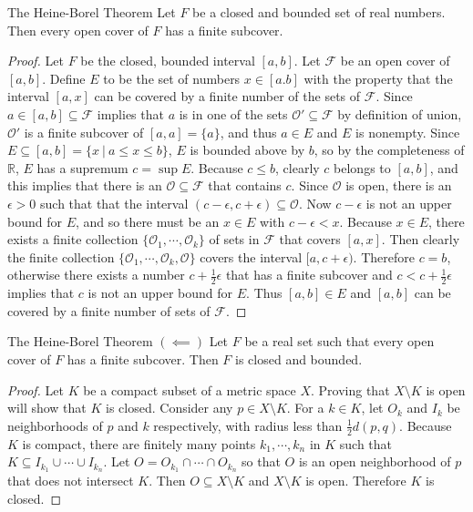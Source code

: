 \documentclass[a4paper,10pt]{book}
\theoremstyle{plain} %
\newcommand{\thistheoremname}{}
\newtheorem*{genericthm*}{\thistheoremname}
\newenvironment{namedthm*}[1]
	{\renewcommand{\thistheoremname}{#1}%
	\begin{genericthm*}}
	{\end{genericthm*}}
\begin{document}
\begin{namedthm*}{The Heine-Borel Theorem}
Let $F$ be a closed and bounded set of real numbers. Then every open cover of $F$ has a finite subcover. 	
\end{namedthm*}
\begin{proof}
	Let $F$ be the closed, bounded interval $[a,b]$. Let $\mathcal{F}$ be an open cover of $[a,b]$. 
	Define $E$ to be the set of numbers $x \in [a.b]$ with the property that the interval $[a,x]$ can be covered by a finite number of the sets of $\mathcal{F}$.
	Since $a\in [a,b] \subseteq \mathcal{F}$ implies that $a$ is in one of the sets $\mathcal{O}' \subseteq \mathcal{F}$ by definition of union, $\mathcal{O}'$ is a finite subcover of $[a,a]=\{a\}$, and thus $a \in E$ and $E$ is nonempty.
	Since $E \subseteq [a,b] = \{x\ |\ a \le x \le b\}$, $E$ is bounded above by $b$, so by the completeness of $\mathbb{R}$, $E$ has a supremum $c = \sup E$.
	Because $c \le b$, clearly $c$ belongs to $[a,b]$, and this implies that there is an $\mathcal{O} \subseteq \mathcal{F}$ that contains $c$.
	Since $\mathcal{O}$ is open, there is an $\epsilon >0$ such that that the interval $(c- \epsilon, c+ \epsilon) \subseteq \mathcal{O}$.
	Now $c-\epsilon$ is not an upper bound for $E$, and so there must be an $x \in E$ with $c-\epsilon < x$. Because $x \in E$, there exists a finite collection $\{ \mathcal{O}_1, \cdots, \mathcal{O}_k \}$ of sets in $\mathcal{F}$ that covers $[a,x]$.
	Then clearly the finite collection $\{ \mathcal{O}_1, \cdots, \mathcal{O}_k, \mathcal{O} \}$ covers the interval $[a,c+ \epsilon)$.
	Therefore $c=b$, otherwise there exists a number $c +\tfrac{1}{2}\epsilon$ that has a finite subcover and $c < c +\tfrac{1}{2}\epsilon$ implies that $c$ is not an upper bound for $E$.
	Thus $[a,b] \in E$ and $[a,b]$ can be covered by a finite number of sets of $\mathcal{F}$.
\end{proof}

\begin{namedthm*}{The Heine-Borel Theorem $(\impliedby)$}
	Let $F$ be a real set such that every open cover of $F$ has a finite subcover. Then $F$ is closed and bounded.
\end{namedthm*}
\begin{proof}
	Let $K$ be a compact subset of a metric space $X$. Proving that $X \setminus K$ is open will show that $K$ is closed.
	Consider any $p \in X \setminus K$. For a $k \in K$, let $O_k$ and $I_k$ be neighborhoods of $p$ and $k$ respectively, with radius less than $\tfrac{1}{2} d(p,q)$.
	Because $K$ is compact, there are finitely many points $k_1, \cdots, k_n$ in $K$ such that $K \subseteq I_{k_1} \cup \cdots \cup I_{k_n}$.
	Let $O = O_{k_1} \cap \cdots \cap O_{k_n}$ so that $O$ is an open neighborhood of $p$ that does not intersect $K$.
	Then $O \subseteq X \setminus K$ and $X\setminus K$ is open. Therefore $K$ is closed. 
\end{proof}
\end{document}
